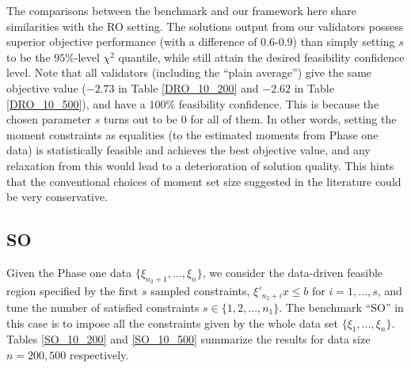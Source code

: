 \documentclass[mnsc,blindrev]{informs4} %
\begin{document}
The comparisons between the benchmark and our framework here share similarities with the RO setting. The solutions output from our validators possess superior objective performance (with a difference of $0.6$-$0.9$) than simply setting $s$ to be the $95\%$-level $\chi^2$ quantile, while still attain the desired feasibility confidence level. Note that all validators (including the ``plain average'') give the same objective value ($-2.73$ in Table \ref{DRO_10_200} and $-2.62$ in Table \ref{DRO_10_500}), and have a $100\%$ feasibility confidence. This is because the chosen parameter $s$ turns out to be 0 for all of them. In other words, setting the moment constraints as equalities (to the estimated moments from Phase one data) is statistically feasible and achieves the best objective value, and any relaxation from this would lead to a deterioration of solution quality. This hints that the conventional choices of moment set size suggested in the literature could be very conservative.

\subsection{SO}\label{sec:numerics on SO}
Given the Phase one data $\{\xi_{n_2+1},\ldots,\xi_{n}\}$, we consider the data-driven feasible region specified by the first $s$ sampled constraints, $\xi'_{n_2+i}x\leq b\text{ for }i=1,\ldots,s$, and tune the number of satisfied constraints $s\in\{1,2,\ldots,n_1\}$. The benchmark ``SO'' in this case is to impose all the constraints given by the whole data set $\{\xi_1,\ldots,\xi_n\}$. Tables \ref{SO_10_200} and \ref{SO_10_500} summarize the results for data size $n=200,500$ respectively.
\end{document}
